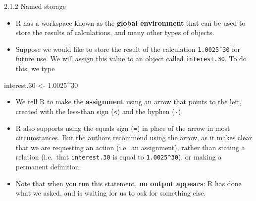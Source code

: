 \documentclass[
  9pt,
  a4paper,
  ignorenonframetext,
  notheorems]{beamer}
\newenvironment{Shaded}{\begin{snugshade}}{\end{snugshade}}
\newcommand{\DecValTok}[1]{\textcolor[rgb]{0.68,0.00,0.00}{#1}}
\newcommand{\FloatTok}[1]{\textcolor[rgb]{0.68,0.00,0.00}{#1}}
\newcommand{\NormalTok}[1]{\textcolor[rgb]{0.00,0.23,0.31}{#1}}
\newcommand{\OtherTok}[1]{\textcolor[rgb]{0.00,0.23,0.31}{#1}}
\newcommand{\SpecialCharTok}[1]{\textcolor[rgb]{0.37,0.37,0.37}{#1}}
\begin{document}
\begin{frame}[fragile]{2.1.2 Named storage}
\protect\hypertarget{named-storage}{}
\begin{itemize}
\item
  R has a workspace known as the \textbf{global environment} that can be
  used to store the results of calculations, and many other types of
  objects.
\item
  Suppose we would like to store the result of the calculation
  \texttt{1.0025ˆ30} for future use. We will assign this value to an
  object called \texttt{interest.30}. To do this, we type
\end{itemize}

\begin{Shaded}
\begin{Highlighting}[]
\NormalTok{interest}\FloatTok{.30} \OtherTok{\textless{}{-}} \FloatTok{1.0025}\SpecialCharTok{\^{}}\DecValTok{30}
\end{Highlighting}
\end{Shaded}

\begin{itemize}
\item
  We tell R to make the \textbf{assignment} using an arrow that points
  to the left, created with the less-than sign (\texttt{\textless{}})
  and the hyphen (\texttt{-}).
\item
  R also supports using the equals sign (\texttt{=}) in place of the
  arrow in most circumstances. But the authors recommend using the
  arrow, as it makes clear that we are requesting an action (i.e.~an
  assignment), rather than stating a relation (i.e.~that
  \texttt{interest.30} is equal to \texttt{1.0025\^{}30}), or making a
  permanent definition.
\item
  Note that when you run this statement, \textbf{no output appears}: R
  has done what we asked, and is waiting for us to ask for something
  else.
\end{itemize}
\end{frame}
\end{document}
